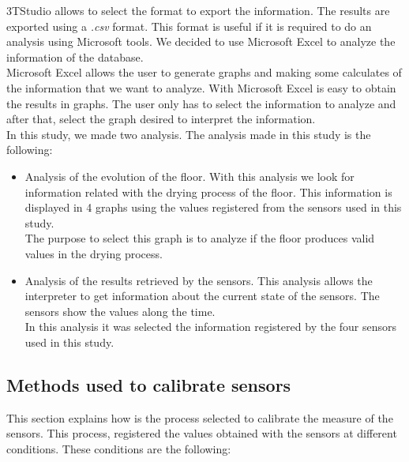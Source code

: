 3TStudio allows to select the format to export the information. The results are exported using a \textit{.csv} format. This format is useful if it is required to do an analysis using Microsoft tools. We decided to use Microsoft Excel to analyze the information of the database.\\


Microsoft Excel allows the user to generate graphs and making some calculates of the information that we want to analyze. With Microsoft Excel is easy to obtain the results in graphs. The user only has to select the information to analyze and after that, select the graph desired to interpret the information.\\

In this study, we made two analysis. The analysis made in this study is the following:

\begin{itemize}

\item Analysis of the evolution of the floor. With this analysis we look for information related with the drying process of the floor. This information is displayed in 4 graphs using the values registered from the sensors used in this study.\\

The purpose to select this graph is to analyze if the floor produces valid values in the drying process.

\item Analysis of the results retrieved by the sensors. This analysis allows the interpreter to get information about the current state of the sensors. The sensors show the values along the time.\\

In this analysis it was selected the information registered by the four sensors used in this study.

\end{itemize}

\subsection{Methods used to calibrate sensors}

This section explains how is the process selected to calibrate the measure of the sensors. This process, registered the values obtained with the sensors at different conditions. These conditions are the following:

